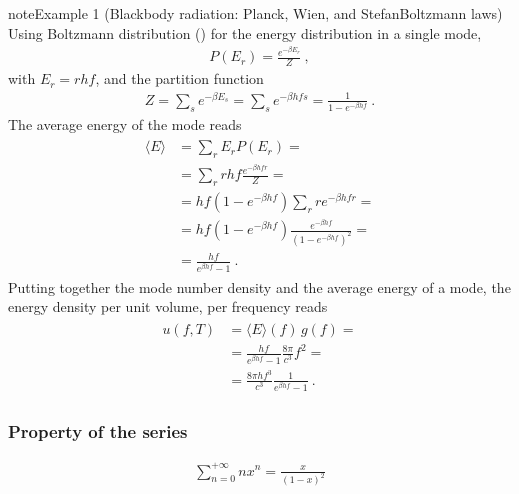 \documentclass[letterpaper,10pt,english]{jupyterBook}
\begin{document}
\begin{sphinxadmonition}{note}{Example 1 (Black\sphinxhyphen{}body radiation: Planck, Wien, and Stefan\sphinxhyphen{}Boltzmann laws)}
\sphinxAtStartPar
Using Boltzmann distribution () for the energy distribution in a single mode,
\begin{equation*}
\begin{split}P(E_r) = \frac{e^{-\beta E_r}}{Z} \ ,\end{split}
\end{equation*}
\sphinxAtStartPar
with \(E_r = r h f\), and the partition function
\begin{equation*}
\begin{split}Z = \sum_{s} e^{- \beta E_s} = \sum_s e^{-\beta h f s} = \frac{1}{1 - e^{-\beta h f}} \ .\end{split}
\end{equation*}
\sphinxAtStartPar
The average energy of the mode reads
\begin{equation*}
\begin{split}\begin{aligned}
  \langle E \rangle
  & = \sum_r E_r P(E_r) = \\
  & = \sum_r r h f \frac{e^{- \beta h f r}}{Z} = \\
  & = h f (1-e^{-\beta h f}) \sum_r r e^{- \beta h f r} = \\
  & = h f (1-e^{-\beta h f}) \frac{e^{- \beta h f}}{(1-e^{-\beta h f})^2} = \\
  & = \frac{h f}{e^{\beta h f} - 1}  \ .
\end{aligned}\end{split}
\end{equation*}
\sphinxAtStartPar
Putting together the mode number density and the average energy of a mode, the energy density per unit volume, per frequency reads
\begin{equation*}
\begin{split}\begin{aligned}
  u(f, T)
  & = \langle E \rangle(f) \, g(f) = \\
  & = \frac{hf}{e^{\beta h f} - 1} \frac{8 \pi}{c^3} f^2 = \\
  & = \frac{8 \pi h f^3}{c^3} \frac{1}{e^{\beta h f} - 1} \ .
\end{aligned}\end{split}
\end{equation*}\subsubsection*{Property of the series}
\begin{equation*}
\begin{split}\sum_{n=0}^{+\infty} n x^n = \frac{x}{(1-x)^2}\end{split}

\end{equation*}
\end{sphinxadmonition}
\end{document}
